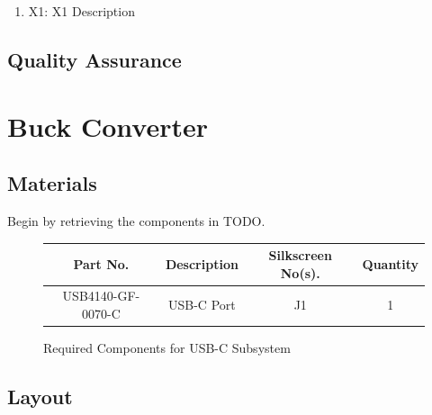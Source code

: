\documentclass{article}
\begin{document}
\begin{enumerate}
  \item X1: X1 Description
\end{enumerate}
\subsection{Quality Assurance}

\section{Buck Converter}

\subsection{Materials}
Begin by retrieving the components in TODO.

\begin{figure}[H]
    \begin{center}
        \begin{tabular}{ c|c|c|c } 
            \textbf{Part No.} & \textbf{Description} & \textbf{Silkscreen No(s).} & \textbf{Quantity} \\ 
            \hline
            USB4140-GF-0070-C & USB-C Port & J1 & 1 \\ 
        \end{tabular}
    \end{center}
    \caption{Required Components for USB-C Subsystem}
    \label{tbl:TODO-materials}
\end{figure}

\subsection{Layout}
\end{document}
